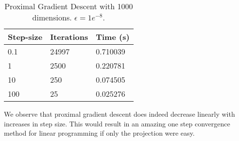 \documentclass[letterpaper,twocolumn,12pt]{article}
\begin{document}
\begin{table}[]
\begin{tabular}{|l|l|l|}
\hline
Step-size & Iterations & Time (s) \\ \hline
0.1       & 24997      & 0.710039 \\ \hline
1         & 2500       & 0.220781 \\ \hline
10        & 250        & 0.074505 \\ \hline
100       & 25         & 0.025276 \\ \hline
\end{tabular}
\caption{Proximal Gradient Descent with 1000 dimensions. $\epsilon=1e^{-8}$.}
\label{tab:table2}
\end{table}
We observe that proximal gradient descent does indeed decrease linearly with increases
in step size. This would result in an amazing one step convergence method for linear
programming if only the projection were easy.
\end{document}
